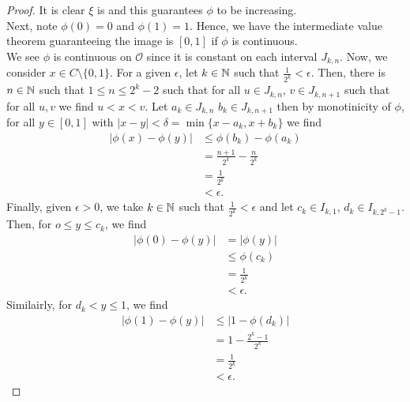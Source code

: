 \begin{proof}
	It is clear \(\xi\) is and this guarantees \(\phi\) to be increasing.\\
	Next, note \(\phi\left( 0 \right) = 0\) and \(\phi\left( 1 \right) = 1\). Hence, we have the intermediate value theorem guaranteeing the image is \(\left[ 0, 1 \right] \) if \(\phi\) is continuous.\\
	We see \(\phi\) is continuous on \(\mathscr{O}\) since it is constant on each interval \(J_{k, n}\). Now, we consider \(x \in C \setminus \{0, 1\} \). For a given \(\epsilon\), let \(k \in \mathbb{N}\) such that \(\frac{1}{2^{k}} < \epsilon\). Then, there is \(n \in \mathbb{N}\) such that \(1 \le  n \le 2^{k} -2\) such that for all \(u \in J_{k, n}\), \(v \in J_{k, n+1}\) such that for all \(u, v\) we find \(u < x < v\). Let \(a_{k} \in J_{k, n}\) \(b_{k} \in J_{k, n+1}\) then by monotinicity of \(\phi\), for all \(y \in \left[ 0, 1 \right] \) with \(\left| x-y \right|  < \delta = \min \{x-a_{k}, x+b_{k}\} \) we find
	\begin{align*}
		\left| \phi\left( x \right) - \phi\left( y \right)  \right|  &\le \phi\left( b_{k} \right) - \phi\left( a_{k} \right) \\
		&= \frac{n+1}{2^{k}} - \frac{n}{2^{k}} \\
		&= \frac{1}{2^{k}} \\
		&< \epsilon
	.\end{align*}
	Finally, given \(\epsilon > 0\), we take \(k \in \mathbb{N}\) such that \(\frac{1}{2^{k}} < \epsilon\) and let \(c_{k} \in I_{k, 1}\), \(d_{k} \in I_{k, 2^{k} - 1}\). Then, for \(o \le y \le c_{k}\), we find \begin{align*}
		\left| \phi\left( 0 \right)  - \phi\left( y \right)  \right| &= \left| \phi\left( y \right)  \right| \\
									     &\le \phi\left( c_{k} \right) \\
&= \frac{1}{2^{k}} \\
& < \epsilon
.\end{align*}
Similairly, for \(d_{k} < y \le 1\), we find
\begin{align*}
	\left| \phi\left( 1 \right) - \phi\left( y \right)  \right| &\le \left| 1 - \phi\left( d_{k} \right)  \right| \\
								    &= 1-\frac{2^{k} - 1}{2^{k}} \\
								    &= \frac{1}{2^{k}} \\
								    &< \epsilon
.\end{align*}
\end{proof}
